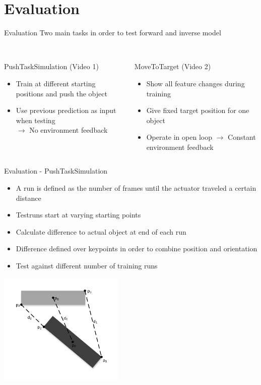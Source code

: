 \documentclass{beamer}
\begin{document}
\section{Evaluation}
\begin{frame}{Evaluation}
Two main tasks in order to test forward and inverse model \\~\\
\begin{columns}
\begin{column}[t]{.50\textwidth}
PushTaskSimulation (Video 1)
\begin{itemize}
\item Train at different starting positions and push the object
\item Use previous prediction as input when testing \\$\rightarrow$ No environment feedback
\end{itemize}
\end{column}
\begin{column}[t]{.50\textwidth}
MoveToTarget (Video 2)
\begin{itemize}
\item Show all feature changes during training
\item Give fixed target position for one object 
\item Operate in open loop $\rightarrow$ Constant environment feedback
\end{itemize}
\end{column}
\end{columns}
\end{frame}

\begin{frame}{Evaluation - PushTaskSimulation}
\begin{itemize}
\item A run is defined as the number of frames until the actuator traveled a certain distance
\item Testruns start at varying starting points
\item Calculate difference to actual object at end of each run
\item Difference defined over keypoints in order to combine position and orientation
\item Test against different number of training runs
\end{itemize}
\includegraphics[width=0.45\textwidth]{Keypoints.pdf}
\end{frame}
\end{document}

